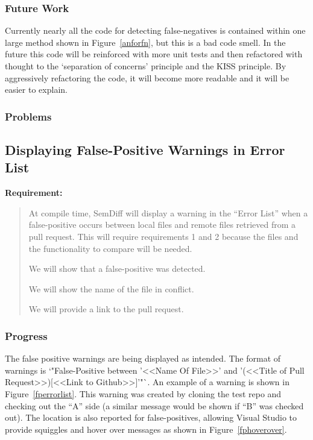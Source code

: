\documentclass[draftclsnofoot,onecolumn]{IEEEtran}
\begin{document}
\subsubsection{Future Work}

Currently nearly all the code for detecting false-negatives is contained 
within one large method shown in Figure~\ref{anforfn}, but this is a bad code 
smell. In the future this code will be reinforced with more unit tests and 
then refactored with thought to the ‘separation of concerns’ principle and 
the KISS principle. By aggressively refactoring the code, it will become more 
readable and it will be easier to explain.

\subsubsection{Problems}






\subsection{Displaying False-Positive Warnings in Error List}

\textbf{Requirement:}

\begin{quote}

At compile time, SemDiff will display a warning in the “Error List” when a 
false-positive occurs between local files and remote files retrieved from a 
pull request. This will require requirements 1 and 2 because the files and 
the functionality to compare will be needed.

We will show that a false-positive was detected.

We will show the name of the file in conflict.

We will provide a link to the pull request.

\end{quote}

\subsubsection{Progress}

The false positive warnings are being displayed as intended. The format of 
warnings is `"False-Positive between '<<Name Of File>>' and '(<<Title of Pull 
Request>>)[<<Link to Github>>]'"`. An example of a warning is shown in 
Figure~\ref{fperrorlist}. This warning was created by cloning the test repo 
and checking out the “A” side (a similar message would be shown if “B” was 
checked out). The location is also reported for false-positives, allowing 
Visual Studio to provide squiggles and hover over messages as shown in 
Figure~\ref{fphoverover}.
\end{document}
